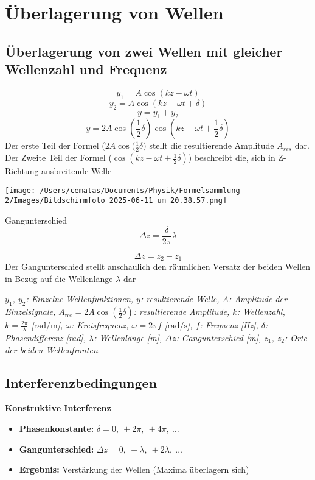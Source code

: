\documentclass[a4paper,10pt]{article}
\newenvironment{displayformula}
{
	\begin{framed}
		\color{formulaColor}
	}
	{\end{framed}}
\newcommand{\formulalegend}[1]{%
	\par\vspace{0.5ex}%
	{{\color{legendColor}\RaggedRight\small\textit{#1}}}%
	\par\vspace{1.5ex}%
}
\begin{document}
\section{Überlagerung von Wellen}

\subsection{Überlagerung von zwei Wellen mit gleicher Wellenzahl und Frequenz}
\begin{displayformula}
\[
y_1 = A \cos (kz - \omega t)
\]
\[
y_2 = A \cos (kz - \omega t + \delta)
\]
\[
y = y_1 + y_2
\]
\[
y = 2 A \cos (\frac{1}{2} \delta) \cos (kz - \omega t + \frac{1}{2} \delta)
\]
Der erste Teil der Formel ($2A \cos (\frac{1}{2} \delta$) stellt die resultierende Amplitude $A_{res}$ dar. \\
Der Zweite Teil der Formel ($\cos (kz - \omega t + \frac{1}{2} \delta)$) beschreibt die, sich in Z-Richtung ausbreitende Welle
\end{displayformula}

\texttt{[image: /Users/cematas/Documents/Physik/Formelsammlung 2/Images/Bildschirmfoto 2025-06-11 um 20.38.57.png]}

\begin{displayformula}
	Gangunterschied
	\[
	\Delta z = \frac{\delta}{2 \pi} \lambda
	\]
	
	\[
	\Delta z = z_2 - z_1
	\]
	Der Gangunterschied stellt anschaulich den räumlichen Versatz der beiden Wellen in Bezug auf die Wellenlänge $\lambda$ dar
\end{displayformula}

\formulalegend{
	$y_1$, $y_2$: Einzelne Wellenfunktionen, 
	$y$: resultierende Welle, 
	$A$: Amplitude der Einzelsignale, 
	$A_{\text{res}} = 2A \cos(\frac{1}{2}\delta)$: resultierende Amplitude, 
	$k$: Wellenzahl, $k = \frac{2\pi}{\lambda}$ [$\text{rad}/\text{m}$], 
	$\omega$: Kreisfrequenz, $\omega = 2\pi f$ [$\text{rad}/\text{s}$], 
	$f$: Frequenz [Hz], 
	$\delta$: Phasendifferenz [rad], 
	$\lambda$: Wellenlänge [m], 
	$\Delta z$: Gangunterschied [m], 
	$z_1$, $z_2$: Orte der beiden Wellenfronten
}



\subsection{Interferenzbedingungen}

\textbf{Konstruktive Interferenz}

\begin{itemize}
	\item \textbf{Phasenkonstante:} $\delta = 0,\ \pm 2\pi,\ \pm 4\pi,\ \dots$
	\item \textbf{Gangunterschied:} $\Delta z = 0,\ \pm \lambda,\ \pm 2\lambda,\ \dots$
	\item \textbf{Ergebnis:} Verstärkung der Wellen (Maxima überlagern sich)
\end{itemize}
\end{document}
